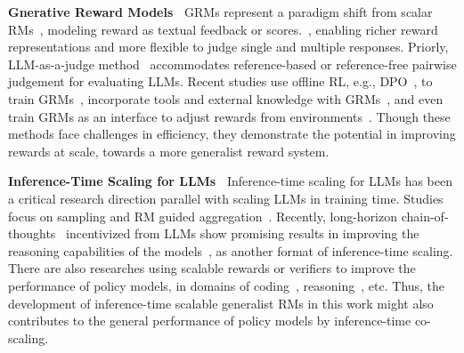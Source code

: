 \documentclass{article} %
\begin{document}


\noindent\textbf{Gnerative Reward Models\ } 
GRMs represent a paradigm shift from scalar RMs~\citep{instructgpt}, modeling reward as textual feedback or scores.~\citep{li2024generative, kim-etal-2024-prometheus, wang2024selftaughtevaluators,cao2024compassjudger1allinonejudgemodel, vu-etal-2024-foundational, alexandru2025atlaseleneminigeneral}, enabling richer reward representations and more flexible to judge single and multiple responses. Priorly, LLM-as-a-judge method~\citep{chatbot-arena} accommodates reference-based or reference-free pairwise judgement for evaluating LLMs. Recent studies use offline RL, e.g., DPO~\citep{rafailov2023direct}, to train GRMs~\citep{wu2024metarewardinglanguagemodelsselfimproving,mahan2024generativerewardmodels,yu2025improvellmasajudgeabilitygeneral,ye2025learning}, incorporate tools and external knowledge with GRMs~\citep{li2024toolaugmented,peng2025agenticrewardmodelingintegrating}, and even train GRMs as an interface to adjust rewards from environments~\citep{baker2025monitoring}. 
Though these methods face challenges in efficiency, they demonstrate the potential in improving rewards at scale, towards a more generalist reward system. 

\noindent\textbf{Inference-Time Scaling for LLMs\ }
Inference-time scaling for LLMs has been a critical research direction parallel with scaling LLMs in training time. Studies focus on sampling and RM guided aggregation~\citep{lightman2024lets,brown2024largelanguagemonkeysscaling,snell2025scaling,wu2025inference}. Recently, long-horizon chain-of-thoughts~\citep{wei2022chain} incentivized from LLMs show promising results in improving the reasoning capabilities of the models~\citep{openai2024openaio1card,deepseekai2025deepseekr1incentivizingreasoningcapability,o3-system-card}, as another format of inference-time scaling. There are also researches using scalable rewards or verifiers to improve the performance of policy models, in domains of coding~\citep{chen2023codet}, reasoning~\citep{lifshitz2025multiagentverificationscalingtesttime}, etc. Thus, the development of inference-time scalable generalist RMs in this work might also contributes to the general performance of policy models by inference-time co-scaling. 
\end{document}
